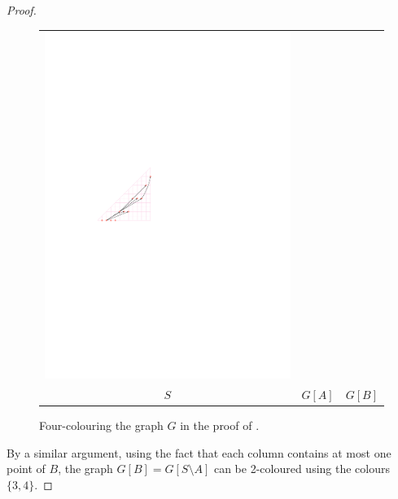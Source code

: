 \documentclass{patmorin}
\begin{document}
\begin{proof}
\begin{figure}
{\begin{tabular}{ccc}
         \includegraphics{figs/four-colouring-3} \\
         $S$ & $G[A]$ & $G[B]$
      \end{tabular}
      }
      \caption{Four-colouring the graph $G$ in the proof of 
               .}
   \end{figure}
   By a similar argument, using the fact that each column contains at
   most one point of $B$, the graph $G[B] = G[S\setminus A]$ can be
   2-coloured using the colours $\{3,4\}$.


\end{proof}
\end{document}
